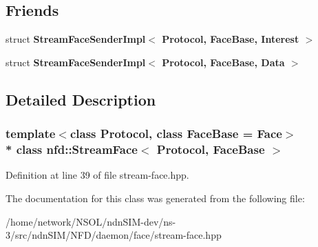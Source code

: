 \subsection*{Friends}
\begin{DoxyCompactItemize}
\item 
struct {\bfseries Stream\+Face\+Sender\+Impl$<$ Protocol, Face\+Base, Interest $>$}\hypertarget{classnfd_1_1StreamFace_acc568d8d6abbaf79707eb5545c4b8d3d}{}\label{classnfd_1_1StreamFace_acc568d8d6abbaf79707eb5545c4b8d3d}

\item 
struct {\bfseries Stream\+Face\+Sender\+Impl$<$ Protocol, Face\+Base, Data $>$}\hypertarget{classnfd_1_1StreamFace_a28119b6368569ed75527dfb57c40a6b7}{}\label{classnfd_1_1StreamFace_a28119b6368569ed75527dfb57c40a6b7}

\end{DoxyCompactItemize}


\subsection{Detailed Description}
\subsubsection*{template$<$class Protocol, class Face\+Base = Face$>$\\*
class nfd\+::\+Stream\+Face$<$ Protocol, Face\+Base $>$}



Definition at line 39 of file stream-\/face.\+hpp.



The documentation for this class was generated from the following file\+:\begin{DoxyCompactItemize}
\item 
/home/network/\+N\+S\+O\+L/ndn\+S\+I\+M-\/dev/ns-\/3/src/ndn\+S\+I\+M/\+N\+F\+D/daemon/face/stream-\/face.\+hpp\end{DoxyCompactItemize}
